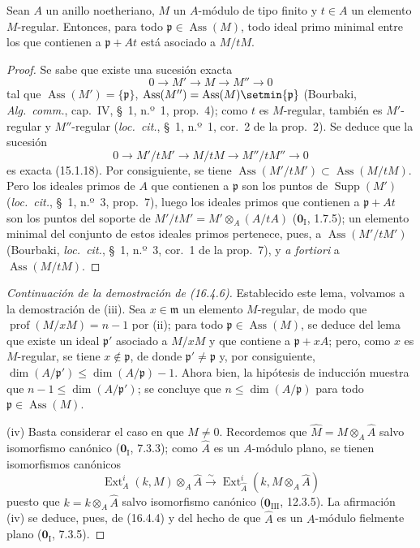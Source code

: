 \begin{lemma}[16.4.6.3]
\label{0.16.4.6.3-es}
Sean $A$ un anillo noetheriano, $M$ un $A$-módulo de tipo finito y $t\in A$ un
elemento $M$-regular. Entonces, para todo
$\mathfrak{p}\in\operatorname{Ass}(M)$, todo ideal primo minimal entre los que
contienen a $\mathfrak{p}+At$ está asociado a $M/tM$.
\end{lemma}

\begin{proof}
Se sabe que existe una sucesión exacta
\[
  0\to M'\to M\to M''\to0
\]
tal que $\operatorname{Ass}(M')=\{\mathfrak{p}\}$,
$\operatorname{Ass}(M'')=\operatorname{Ass}(M)\setmin\{\mathfrak{p}\}$ (Bourbaki,
\emph{Alg.~comm.}, cap.~IV, \S~1, n.º~1, prop.~4); como $t$ es
$M$-regular, también es $M'$-regular y $M''$-regular
(\emph{loc.~cit.}, \S~1, n.º~1, cor.~2 de la prop.~2). Se deduce que la
sucesión
\[
  0\to M'/tM'\to M/tM\to M''/tM''\to0
\]
es exacta (15.1.18). Por consiguiente, se tiene
$\operatorname{Ass}(M'/tM')\subset\operatorname{Ass}(M/tM)$. Pero los ideales
primos de $A$ que contienen a $\mathfrak{p}$ son los puntos de
$\operatorname{Supp}(M')$ (\emph{loc.~cit.}, \S~1, n.º~3, prop.~7), luego los
ideales primos que contienen a $\mathfrak{p}+At$ son los puntos del soporte de
$M'/tM'=M'\otimes_A(A/tA)$ ($\mathbf{0}_{\mathrm I}$, 1.7.5); un elemento minimal del
conjunto de estos ideales primos pertenece, pues, a
$\operatorname{Ass}(M'/tM')$ (Bourbaki, \emph{loc.~cit.}, \S~1, n.º~3,
cor.~1 de la prop.~7), y \emph{a fortiori} a
$\operatorname{Ass}(M/tM)$.
\end{proof}

\begin{proof}[Continuación de la demostración de (16.4.6)]
Establecido este lema, volvamos a la demostración de (iii). Sea
$x\in\mathfrak{m}$ un elemento $M$-regular, de modo que
$\operatorname{prof}(M/xM)=n-1$ por (ii); para todo
$\mathfrak{p}\in\operatorname{Ass}(M)$, se deduce del lema que existe un ideal
$\mathfrak{p}'$ asociado a $M/xM$ y que contiene a $\mathfrak{p}+xA$; pero,
como $x$ es $M$-regular, se tiene $x\notin\mathfrak{p}$, de donde
$\mathfrak{p}'\neq\mathfrak{p}$ y, por consiguiente,
$\dim(A/\mathfrak{p}')\leq\dim(A/\mathfrak{p})-1$. Ahora bien, la hipótesis de
inducción muestra que $n-1\leq\dim(A/\mathfrak{p}')$; se concluye que
$n\leq\dim(A/\mathfrak{p})$ para todo
$\mathfrak{p}\in\operatorname{Ass}(M)$.

(iv) Basta considerar el caso en que $M\neq0$. Recordemos que
$\widehat{M}=M\otimes_A\widehat{A}$ salvo isomorfismo canónico
($\mathbf{0}_{\mathrm I}$, 7.3.3); como $\widehat{A}$ es un $A$-módulo plano, se tienen
isomorfismos canónicos
\[
  \operatorname{Ext}^i_A(k,M)\otimes_A\widehat{A}
  \xrightarrow{\sim}
  \operatorname{Ext}^i_{\widehat{A}}
  (k,M\otimes_A\widehat{A})
\]
puesto que $k=k\otimes_A\widehat{A}$ salvo isomorfismo canónico
($\mathbf{0}_{\mathrm{III}}$, 12.3.5). La afirmación (iv) se deduce, pues, de (16.4.4) y
del hecho de que $\widehat{A}$ es un $A$-módulo fielmente plano
($\mathbf{0}_{\mathrm I}$, 7.3.5).
\end{proof}

